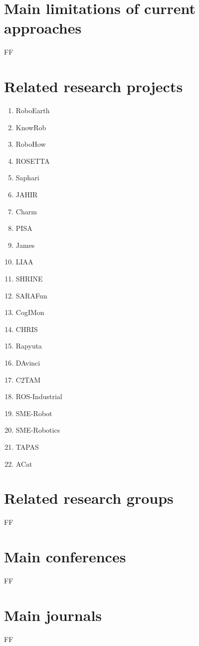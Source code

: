 \section{Main limitations of current approaches}

FF


\section{Related research projects}

\begin{multicols}{4}
	\begin{enumerate}
		\item RoboEarth
		\item KnowRob
		\item RoboHow
		\item ROSETTA
		\item Saphari
		\item JAHIR
		\item Charm
		\item PISA
		\item James
		\item LIAA
		\item SHRINE
		\item SARAFun
		\item CogIMon
		\item CHRIS
		\item Rapyuta
		\item DAvinci
		\item C2TAM
		\item ROS-Industrial
		\item SME-Robot
		\item SME-Robotics
		\item TAPAS
		\item ACat
	\end{enumerate}
\end{multicols}

\section{Related research groups}

FF


\section{Main conferences}

FF


\section{Main journals}

FF

